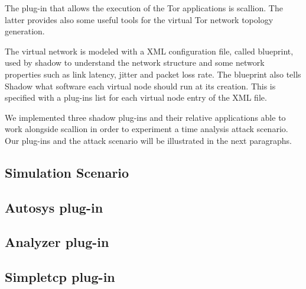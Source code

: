 The plug-in that allows the execution of the Tor applications is
scallion. The latter provides also some useful tools for the virtual
Tor network topology generation.

The virtual network is modeled with a XML configuration
file, called blueprint, used by shadow to understand the network
structure and some network properties such as link latency, jitter and
packet loss rate. The blueprint also tells Shadow what software each
virtual node should run at its creation. This is specified with a
plug-ins list for each virtual node entry of the XML file.

We implemented three shadow plug-ins and their relative applications 
 able to work alongside scallion in
order to experiment a time analysis attack scenario. Our plug-ins and
the attack scenario will be illustrated in the next paragraphs.

\subsection{Simulation Scenario}

\subsection{Autosys plug-in}
\subsection{Analyzer plug-in}
\subsection{Simpletcp plug-in}
